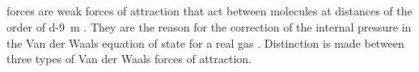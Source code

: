 \subsection{}\label{12.1.8}  forces are weak forces of attraction that act between molecules at distances of the order of \SI{d-9}{\meter} . They are the reason for the correction of the internal pressure in the Van der Waals equation of state for a real gas . Distinction is made between three types of Van der Waals forces of attraction.
